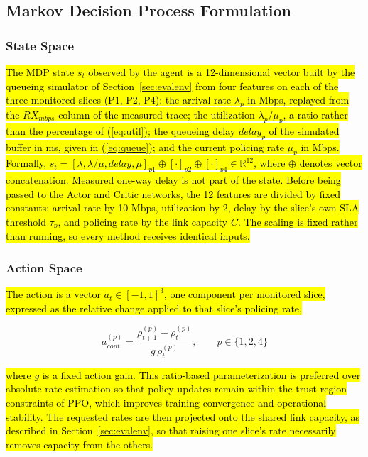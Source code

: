 \documentclass[conference]{IEEEtran}
\newcommand{\rev}[1]{\hl{#1}}
\newcommand{\m}[1]{\mbox{$#1$}}
\begin{document}
\subsection{Markov Decision Process Formulation}\label{sec:mdp}

\subsubsection{State Space}

\rev{The MDP state \m{s_t} observed by the agent is a 12-dimensional vector built by the queueing simulator of Section~\ref{sec:evalenv} from four features on each of the three monitored slices (P1, P2, P4): the arrival rate \m{\lambda_p} in Mbps, replayed from the \m{RX_{mbps}} column of the measured trace; the utilization \m{\lambda_p/\mu_p}, a ratio rather than the percentage of (\ref{eq:util}); the queueing delay \m{delay_p} of the simulated buffer in ms, given in (\ref{eq:queue}); and the current policing rate \m{\mu_p} in Mbps. Formally, \m{s_t = [\lambda, \lambda/\mu, delay, \mu]_{p1} \oplus [\cdot]_{p2} \oplus [\cdot]_{p4} \in \mathbb{R}^{12}}, where \m{\oplus} denotes vector concatenation. Measured one-way delay is not part of the state. Before being passed to the Actor and Critic networks, the 12 features are divided by fixed constants: arrival rate by 10 Mbps, utilization by 2, delay by the slice's own SLA threshold \m{\tau_p}, and policing rate by the link capacity \m{C}. The scaling is fixed rather than running, so every method receives identical inputs.}

\subsubsection{Action Space}

\rev{The action is a vector \m{a_t \in [-1,1]^3}, one component per monitored slice, expressed as the relative change applied to that slice's policing rate,}

\begin{equation}\label{eq:action}
a_{cont}^{(p)} = \frac{\rho_{t + 1}^{(p)} - \rho_{t}^{(p)}}{g\,\rho_{t}^{(p)}},\qquad p \in \{1,2,4\}
\end{equation}

\rev{where \m{g} is a fixed action gain. This ratio-based parameterization is preferred over absolute rate estimation so that policy updates remain within the trust-region constraints of PPO, which improves training convergence and operational stability. The requested rates are then projected onto the shared link capacity, as described in Section~\ref{sec:evalenv}, so that raising one slice's rate necessarily removes capacity from the others.}
\end{document}
